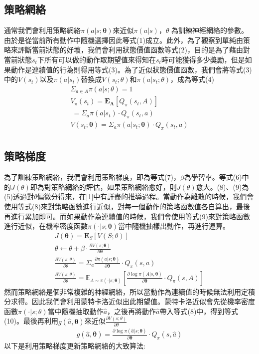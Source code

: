 \documentclass[a4paper,12pt]{article}
\begin{document}
\subsection{策略網絡}
\quad 通常我們會利用策略網絡$\pi(a|s;\mathbf{\theta})$來近似$\pi(a|s)$，$\theta$ 為訓練神經網絡的參數。由於是從當前所有動作中隨機選擇因此等式(1)成立。此外，為了觀察到單純由策略來評斷當前狀態的好壞，我們會利用狀態價值函數等式(2)，目的是為了藉由對當前狀態$s_{t}$下所有可以做的動作取期望值來得知在$s_{t}$時可能獲得多少獎勵，但是如果動作是連續值的行為則得用等式(3)。為了近似狀態價值函數，我們會將等式(3)中的$V(s_{t})$以及$\pi(a|s_{t})$替換成$V(s_{t};\theta)$和$\pi(a|s_{t};\theta)$，成為等式(4)
\begin{align}
& \Sigma_{a \in A}\pi(a|s;\theta)=1&\\
& V_{\pi}(s_{t})=\mathbf{E_{A}}[Q_{\pi}(s_{t},A)]&\\
&\ =\Sigma_{a}\pi(a|s_{t})\cdot Q_{\pi}(s_{t},a)&\\
&V(s_{t};\mathbf{\theta})=\Sigma_{a}\pi(a|s_{t};\mathbf{\theta})\cdot Q_{\pi}(s_{t},a)&\\
\end{align}

\subsection{策略梯度}
\qquad 為了訓練策略網絡，我們會利用策略梯度，即為等式(7)，$\beta$為學習率。等式(6)中的$J(\theta)$即為對策略網絡的評估，如果策略網絡愈好，則$J(\theta)$愈大。(8)、(9)為(5)透過對$\theta$偏微分得來，在[1]中有詳盡的推導過程。當動作為離散的時候，我們會使用等式(8)來對策略函數進行近似，對每一個動作的策略函數值各自算出，最後再進行累加即可。而如果動作為連續值的時候，我們會使用等式(9)來對策略函數進行近似，在機率密度函數$\pi(\cdot|s;\mathbf{\theta})$當中隨機抽樣出動作，再進行運算。
\begin{align}
&J(\mathbf{\theta})=\mathbf{E}_{S}[V(S;\theta)]&\\
&\theta\leftarrow\theta+\beta\cdot\frac{\partial V(s;\mathbf{\theta})}{\partial\mathbf{\theta}}&\\
&\frac{\partial V(s;\theta)}{\partial \theta}=\Sigma_{a}\frac{\partial\pi(a|s;\mathbf{\theta})}{\partial\mathbf{\theta}}\cdot Q_{\pi}(s,a)&\\
&\frac{\partial V(s;\theta)}{\partial \theta}=\mathbb{E}_{A\sim\pi(\cdot|s;\mathbf{\theta})}[\frac{\partial \log\pi(A|s,\mathbf{\theta})}{\partial\mathbf{\theta}}\cdot Q_{\pi}(s,A)]&
\end{align}
\qquad 然而策略網絡是個非常複雜的神經網絡，所以當動作為連續值的時候無法利用定積分求得。因此我們會利用蒙特卡洛近似出此期望值。蒙特卡洛近似會先從機率密度函數$\pi(\cdot|s;\theta)$當中隨機抽取動作$\hat{a}$，之後再將動作$\hat{a}$帶入等式(8)中，得到等式(10)。最後再利用$g(\hat{a},\mathbf{\theta})$來近似$\frac{\partial V(s;\theta)}{\partial \theta}$\newline
\begin{align}
&g(\hat{a},\mathbf{\theta})=\frac{\partial\log\pi(\hat{a}|s;\mathbf{\theta})}{\partial\mathbf{\theta}}\cdot Q_{\pi}(s,\hat{a})&
\end{align}
以下是利用策略梯度更新策略網絡的大致算法:
\end{document}

